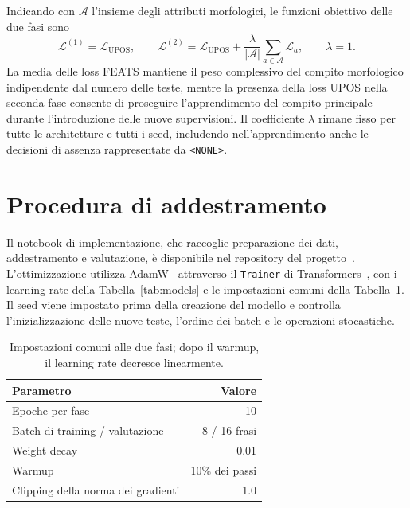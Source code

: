 \documentclass[12pt,a4paper]{report}
\begin{document}
Indicando con $\mathcal A$ l'insieme degli attributi morfologici, le funzioni obiettivo delle due fasi sono
\begin{equation}
\label{eq:joint-training-loss}
 \mathcal L^{(1)}=\mathcal L_{\mathrm{UPOS}},
 \qquad
 \mathcal L^{(2)}=\mathcal L_{\mathrm{UPOS}}+
 \frac{\lambda}{|\mathcal A|}\sum_{a\in\mathcal A}\mathcal L_a,
 \qquad \lambda=1.
\end{equation}
La media delle loss FEATS mantiene il peso complessivo del compito morfologico indipendente dal numero delle teste, mentre la presenza della loss UPOS nella seconda fase consente di proseguire l'apprendimento del compito principale durante l'introduzione delle nuove supervisioni. Il coefficiente $\lambda$ rimane fisso per tutte le architetture e tutti i seed, includendo nell'apprendimento anche le decisioni di assenza rappresentate da \texttt{<NONE>}.

\section{Procedura di addestramento}
\label{sec:method-training}

Il notebook di implementazione, che raccoglie preparazione dei dati, addestramento e valutazione, è disponibile nel repository del progetto~\cite{repo}. L'ottimizzazione utilizza AdamW~\cite{adamw2019} attraverso il \texttt{Trainer} di Transformers~\cite{hf}, con i learning rate della Tabella~\ref{tab:models} e le impostazioni comuni della Tabella~\ref{tab:training-settings}. Il seed viene impostato prima della creazione del modello e controlla l'inizializzazione delle nuove teste, l'ordine dei batch e le operazioni stocastiche.

\begin{table}[htbp]
\centering
\begin{tabular}{lr}
\toprule
Parametro & Valore\\
\midrule
Epoche per fase & 10\\
Batch di training / valutazione & 8 / 16 frasi\\
Weight decay & 0.01\\
Warmup & 10\% dei passi\\
Clipping della norma dei gradienti & 1.0\\
\bottomrule
\end{tabular}
\caption{Impostazioni comuni alle due fasi; dopo il warmup, il learning rate decresce linearmente.}
\label{tab:training-settings}
\end{table}
\end{document}
